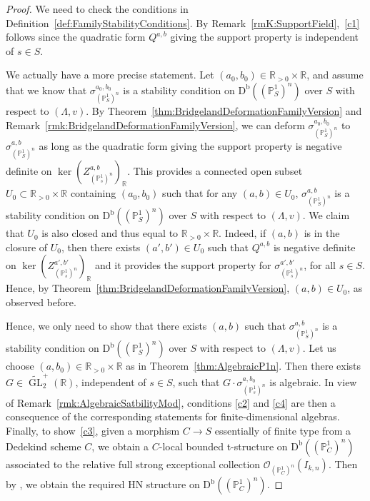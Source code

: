\documentclass[11pt, reqno]{amsart}
\numberwithin{equation}{section}
\theoremstyle{plain}
\theoremstyle{remark}
\theoremstyle{definition}
\theoremstyle{italicsname}
\newcommand{\Db}{\mathrm{D^b}}
\DeclareMathOperator{\GL}{GL}
\newcommand{\cO}{\mathcal{O}}
\def\RR{\ensuremath{\mathbb{R}}}
\def\PP{\ensuremath{\mathbb{P}}}
\begin{document}
\begin{proof}
We need to check the conditions in Definition~\ref{def:FamilyStabilityConditions}.
By Remark~\ref{rmK:SupportField},~\ref{c1} follows since the quadratic form $Q^{a,b}$ giving the support property is independent of $s\in S$.

We actually have a more precise statement.
Let $(a_0,b_0)\in\RR_{>0}\times\RR$, and assume that we know that ${\sigma}^{a_0,b_0}_{(\PP^1_S)^n}$ is a stability condition on $\Db((\PP^1_S)^n)$ over $S$ with respect to $(\Lambda,v)$.
By Theorem~\ref{thm:BridgelandDeformationFamilyVersion} and Remark~\ref{rmk:BridgelandDeformationFamilyVersion}, we can deform ${\sigma}^{a_0,b_0}_{(\PP^1_S)^n}$ to ${\sigma}^{a,b}_{(\PP^1_S)^n}$ as long as the quadratic form giving the support property is negative definite on $\ker(Z^{a,b}_{(\PP^1_s)^n})_\RR$.
This provides a connected open subset $U_0\subset\RR_{>0}\times\RR$ containing $(a_0,b_0)$ such that for any $(a,b)\in U_0$, ${\sigma}^{a,b}_{(\PP^1_S)^n}$ is a stability condition on $\Db((\PP^1_S)^n)$ over $S$ with respect to $(\Lambda,v)$.
We claim that $U_0$ is also closed and thus equal to $\RR_{>0}\times\RR$.
Indeed, if $(a,b)$ is in the closure of $U_0$, then there exists $(a',b')\in U_0$ such that $Q^{a,b}$ is negative definite on $\ker(Z^{a',b'}_{(\PP^1_s)^n})_\RR$ and it provides the support property for $\sigma^{a',b'}_{(\PP^1_s)^n}$, for all $s\in S$.
Hence, by Theorem~\ref{thm:BridgelandDeformationFamilyVersion}, $(a,b)\in U_0$, as observed before.

Hence, we only need to show that there exists $(a,b)$ such that ${\sigma}^{a,b}_{(\PP^1_S)^n}$ is a stability condition on $\Db((\PP^1_S)^n)$ over $S$ with respect to $(\Lambda,v)$.
Let us choose $(a,b_0)\in\RR_{>0}\times\RR$ as in Theorem~\ref{thm:AlgebraicP1n}.
Then there exists $G\in\widetilde{\GL}_2^+(\RR)$, independent of $s\in S$, such that $G\cdot\sigma^{a,b_0}_{(\PP^1_s)^n}$ is algebraic.
In view of Remark~\ref{rmk:AlgebraicSatbilityMod}, conditions \ref{c2} and \ref{c4} are then a consequence of the corresponding statements for finite-dimensional algebras.
Finally, to show~\ref{c3}, given a morphism $C\to S$ essentially of finite type from a Dedekind scheme $C$, 
we obtain a $C$-local bounded t-structure on $\Db((\PP^1_C)^n)$ associated to the relative full strong exceptional collection $\cO_{(\PP^1_C)^n}(I_{k,n})$. 
Then by \cite[Theorem~18.7]{stability-families}, we obtain the required HN structure on $\Db((\PP^1_C)^n)$. 
\end{proof}
\end{document}
